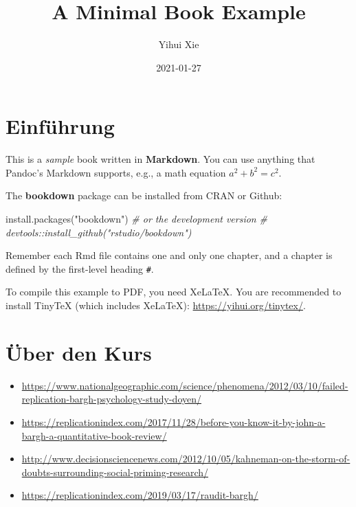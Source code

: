 \documentclass[
]{book}
\title{A Minimal Book Example}
\author{Yihui Xie}
\date{2021-01-27}
\newenvironment{Shaded}{\begin{snugshade}}{\end{snugshade}}
\newcommand{\CommentTok}[1]{\textcolor[rgb]{0.56,0.35,0.01}{\textit{#1}}}
\newcommand{\FunctionTok}[1]{\textcolor[rgb]{0.00,0.00,0.00}{#1}}
\newcommand{\NormalTok}[1]{#1}
\newcommand{\StringTok}[1]{\textcolor[rgb]{0.31,0.60,0.02}{#1}}
\providecommand{\tightlist}{%
  \setlength{\itemsep}{0pt}\setlength{\parskip}{0pt}}
\begin{document}
\maketitle

{
\setcounter{tocdepth}{1}
\tableofcontents
}
\hypertarget{einfuxfchrung}{%
\chapter{Einführung}\label{einfuxfchrung}}

This is a \emph{sample} book written in \textbf{Markdown}. You can use anything that Pandoc's Markdown supports, e.g., a math equation \(a^2 + b^2 = c^2\).

The \textbf{bookdown} package can be installed from CRAN or Github:

\begin{Shaded}
\begin{Highlighting}[]
\FunctionTok{install.packages}\NormalTok{(}\StringTok{"bookdown"}\NormalTok{)}
\CommentTok{\# or the development version}
\CommentTok{\# devtools::install\_github("rstudio/bookdown")}
\end{Highlighting}
\end{Shaded}

Remember each Rmd file contains one and only one chapter, and a chapter is defined by the first-level heading \texttt{\#}.

To compile this example to PDF, you need XeLaTeX. You are recommended to install TinyTeX (which includes XeLaTeX): \url{https://yihui.org/tinytex/}.

\hypertarget{intro}{%
\chapter{Über den Kurs}\label{intro}}

\begin{itemize}
\tightlist
\item
  \url{https://www.nationalgeographic.com/science/phenomena/2012/03/10/failed-replication-bargh-psychology-study-doyen/}
\item
  \url{https://replicationindex.com/2017/11/28/before-you-know-it-by-john-a-bargh-a-quantitative-book-review/}
\item
  \url{http://www.decisionsciencenews.com/2012/10/05/kahneman-on-the-storm-of-doubts-surrounding-social-priming-research/}
\item
  \url{https://replicationindex.com/2019/03/17/raudit-bargh/}
\end{itemize}
\end{document}
